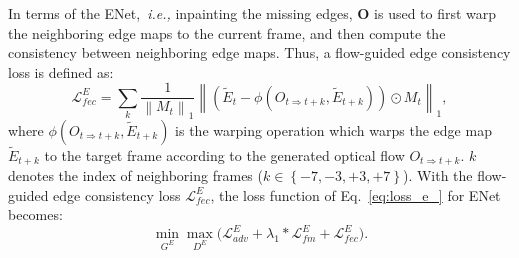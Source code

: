 In terms of the ENet,~\emph{i.e.,} inpainting the missing edges, \(\boldsymbol{O}\) is used to first warp the neighboring edge maps to the current frame, and then compute the consistency between neighboring edge maps. 
%
Thus, a flow-guided edge consistency loss is defined as:
%
\begin{equation}
	\label{eq:flow_edge}
	\mathcal{L}^E_{fec}=\sum_{k}\frac{1}{\left\|M_{t} \right\|_1}\left\|(\widetilde{E}_{t}-\phi(O_{t\Rightarrow t+k},\widetilde{E}_{t+k}))\odot M_{t}\right\|_1,
\end{equation}
where $\phi(O_{t\Rightarrow t+k},\widetilde{E}_{t+k})$ is the warping operation which warps the edge map $\widetilde{E}_{t+k}$ to the target frame according to the generated optical flow $O_{t\Rightarrow t+k}$.
$k$ denotes the index of neighboring frames ($k\in \left\{-7,-3,+3,+7 \right\}$). 
With the flow-guided edge consistency loss $\mathcal{L}^E_{fec}$, the loss function of  Eq.~\eqref{eq:loss_e_} for ENet becomes:
\begin{equation}
\label{eq:loss_e}
\min\limits_{G^E} \max \limits_{D^E} \big(\mathcal{L}^E_{adv}+\lambda_1 * \mathcal{L}^E_{fm}+\mathcal{L}^E_{fec}\big).
\end{equation}




